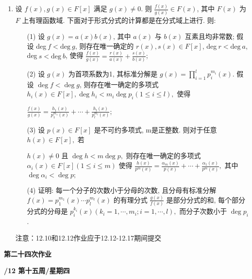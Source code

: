 \documentclass[a4paper,12pt]{article}
\begin{document}
\begin{enumerate}
\item 设 $f(x),g(x)\in F[x]$ 满足 $g(x)\not=0$. 则 $\frac{f(x)}{g(x)}\in F(x)$, 其中 $F(x)$ 为 $F$ 上有理函数域. 下面对于形式分式的计算都是在分式域上进行. 则: 
    \begin{enumerate}
        \item[(1)] 设 $g(x)=a(x)b(x)$, 其中 $a(x)$ 与 $b(x)$ 互素且均非常数; 假设 deg$\ f<\text{deg}\ g$, 则存在唯一确定的 $r(x),s(x)\in F[x]$,  deg$\ r<\text{deg}\ a$, deg$\ s<\text{deg}\ b$, 使得 $\frac{f(x)}{g(x)}=\frac{r(x)}{a(x)}+\frac{s(x)}{b(x)}$;
        \item[(2)] 设 \(g(x)\) 为首项系数为1, 其标准分解是 \(g(x)=\prod\limits_{i=1}^{l}p_{i}^{m_{i}}(x)\).  假设 \(\deg f<\deg g\), 则存在唯一确定的多项式 \(h_{i}(x)\in F[x],\deg h_{i}<m_{i}\deg p_{i}(1\leq i\leq l),\) 使得

\(
\frac{f(x)}{g(x)}=\frac{h_{1}(x)}{p_{1}^{m_{1}}(x)}+\cdots+\frac{h_{l}(x)}{p_{l }^{m_{l}}(x)};
\)

\item[(3)] 设 \(p(x)\in F[x]\) 是不可约多项式, m是正整数. 则对于任意 \(h(x)\in F[x],\) 若

\(h(x)\neq 0\) 且 \(\deg h<m\deg p,\) 则存在唯一确定的多项式 \(\alpha_{i}(x)\in F[x](1\leq i\leq m)\) 使得 \(
\frac{h(x)}{p^{m}(x)}=\frac{\alpha_{m}(x)}{p(x)}+\cdots+\frac{\alpha_{1}(x)}{p^ {m}(x)},
\) 其中 \(\deg\alpha_{i}<\deg p;\)

\item[(4)] 证明: 每一个分子的次数小于分母的次数, 且分母有标准分解 \(f(x)=p_{1}^{m_{1}}(x)\cdots p_{l}^{m_{l}}(x)\) 的有理分式 \(\frac{g(x)}{f(x)}\) 是部分分式的和, 每个部分分式的分母是 \(p_{i}^{k_{i}}(x)(k_{i}=1,\cdots,m_{i};i=1,\cdots,l),\)  而分子次数小于 \(\deg p_{i}\).
    \end{enumerate}

{\color{red} 注意：12.10和12.12作业应于12.12-12.17期间提交}


\end{enumerate}
\newpage
\head

\begin{center} %
	{\Large \bf 第二十四次作业} %
	\vspace{2mm}
	
	{\bf{}/12 \quad  第十五周/星期四} %
\end{center} 
\end{document}
